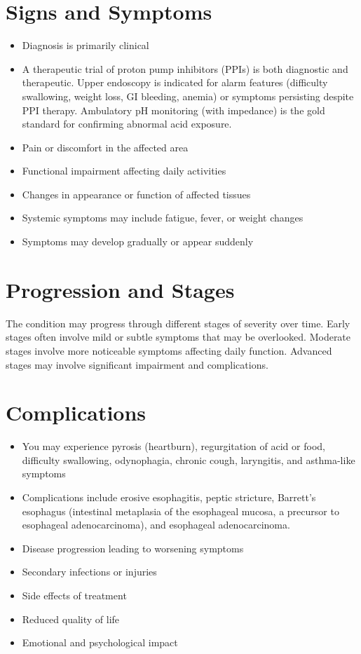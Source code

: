\section{Signs and Symptoms}
\begin{itemize}[noitemsep]
  \item Diagnosis is primarily clinical
  \item A therapeutic trial of proton pump inhibitors (PPIs) is both diagnostic and therapeutic. Upper endoscopy is indicated for alarm features (difficulty swallowing, weight loss, GI bleeding, anemia) or symptoms persisting despite PPI therapy. Ambulatory pH monitoring (with impedance) is the gold standard for confirming abnormal acid exposure.
  \item Pain or discomfort in the affected area
  \item Functional impairment affecting daily activities
  \item Changes in appearance or function of affected tissues
  \item Systemic symptoms may include fatigue, fever, or weight changes
  \item Symptoms may develop gradually or appear suddenly
\end{itemize}
\section{Progression and Stages}
The condition may progress through different stages of severity over time. Early stages often involve mild or subtle symptoms that may be overlooked. Moderate stages involve more noticeable symptoms affecting daily function. Advanced stages may involve significant impairment and complications.
\section{Complications}
\begin{itemize}[noitemsep]
  \item You may experience pyrosis (heartburn), regurgitation of acid or food, difficulty swallowing, odynophagia, chronic cough, laryngitis, and asthma-like symptoms
  \item Complications include erosive esophagitis, peptic stricture, Barrett's esophagus (intestinal metaplasia of the esophageal mucosa, a precursor to esophageal adenocarcinoma), and esophageal adenocarcinoma.
  \item Disease progression leading to worsening symptoms
  \item Secondary infections or injuries
  \item Side effects of treatment
  \item Reduced quality of life
  \item Emotional and psychological impact
\end{itemize}
